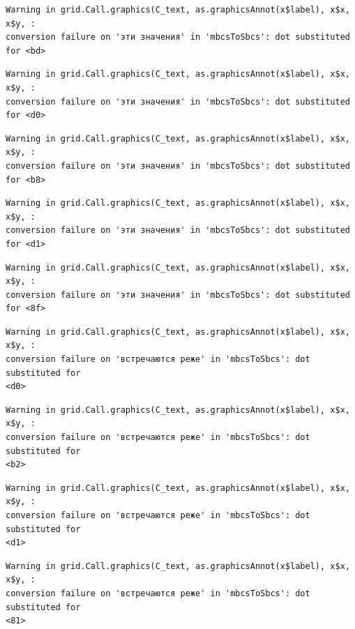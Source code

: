 \documentclass[
  letterpaper,
  DIV=11,
  numbers=noendperiod]{scrreprt}
\theoremstyle{definition}
\theoremstyle{remark}
\begin{document}
\begin{verbatim}
Warning in grid.Call.graphics(C_text, as.graphicsAnnot(x$label), x$x, x$y, :
conversion failure on 'эти значения' in 'mbcsToSbcs': dot substituted for <bd>
\end{verbatim}

\begin{verbatim}
Warning in grid.Call.graphics(C_text, as.graphicsAnnot(x$label), x$x, x$y, :
conversion failure on 'эти значения' in 'mbcsToSbcs': dot substituted for <d0>
\end{verbatim}

\begin{verbatim}
Warning in grid.Call.graphics(C_text, as.graphicsAnnot(x$label), x$x, x$y, :
conversion failure on 'эти значения' in 'mbcsToSbcs': dot substituted for <b8>
\end{verbatim}

\begin{verbatim}
Warning in grid.Call.graphics(C_text, as.graphicsAnnot(x$label), x$x, x$y, :
conversion failure on 'эти значения' in 'mbcsToSbcs': dot substituted for <d1>
\end{verbatim}

\begin{verbatim}
Warning in grid.Call.graphics(C_text, as.graphicsAnnot(x$label), x$x, x$y, :
conversion failure on 'эти значения' in 'mbcsToSbcs': dot substituted for <8f>
\end{verbatim}

\begin{verbatim}
Warning in grid.Call.graphics(C_text, as.graphicsAnnot(x$label), x$x, x$y, :
conversion failure on 'встречаются реже' in 'mbcsToSbcs': dot substituted for
<d0>
\end{verbatim}

\begin{verbatim}
Warning in grid.Call.graphics(C_text, as.graphicsAnnot(x$label), x$x, x$y, :
conversion failure on 'встречаются реже' in 'mbcsToSbcs': dot substituted for
<b2>
\end{verbatim}

\begin{verbatim}
Warning in grid.Call.graphics(C_text, as.graphicsAnnot(x$label), x$x, x$y, :
conversion failure on 'встречаются реже' in 'mbcsToSbcs': dot substituted for
<d1>
\end{verbatim}

\begin{verbatim}
Warning in grid.Call.graphics(C_text, as.graphicsAnnot(x$label), x$x, x$y, :
conversion failure on 'встречаются реже' in 'mbcsToSbcs': dot substituted for
<81>
\end{verbatim}
\end{document}
